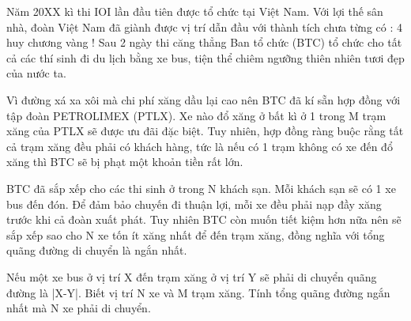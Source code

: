 Năm 20XX kì thi IOI lần đầu tiên được tổ chức tại Việt Nam. Với lợi thế sân nhà, đoàn Việt Nam đã giành được vị trí dẫn đầu với thành tích chưa từng có : 4 huy chương vàng ! Sau 2 ngày thi căng thẳng Ban tổ chức (BTC) tổ chức cho tất cả các thí sinh đi du lịch bằng xe bus, tiện thể chiêm ngưỡng thiên nhiên tươi đẹp của nước ta.  

   Vì đường xá xa xôi mà chi phí xăng dầu lại cao nên BTC đã kí sẵn hợp đồng với tập đoàn PETROLIMEX (PTLX). Xe nào đổ xăng ở bất kì ở 1 trong M trạm xăng của PTLX sẽ được ưu đãi đặc biệt. Tuy nhiên, hợp đồng ràng buộc rằng tất cả trạm xăng đều phải có khách hàng, tức là nếu có 1 trạm không có xe đến đổ xăng thì BTC sẽ bị phạt một khoản tiền rất lớn.  

   BTC đã sắp xếp cho các thi sinh ở trong N khách sạn. Mỗi khách sạn sẽ có 1 xe bus đến đón. Để đảm bảo chuyến đi thuận lợi, mỗi xe đều phải nạp đầy xăng trước khi cả đoàn xuất phát. Tuy nhiên BTC còn muốn tiết kiệm hơn nữa nên sẽ sắp xếp sao cho N xe tốn ít xăng nhất để đến trạm xăng, đồng nghĩa với tổng quãng đường di chuyển là ngắn nhất.  

   Nếu một xe bus ở vị trí X đến trạm xăng ở vị trí Y sẽ phải di chuyển quãng đường là |X-Y|. Biết vị trí N xe và M trạm xăng. Tính tổng quãng đường ngắn nhất mà N xe phải di chuyển.  

\